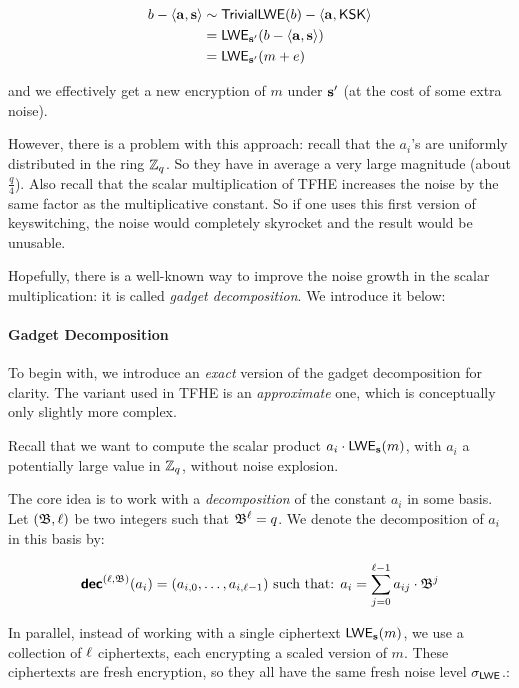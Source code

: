 \begin{align*}
	b - \langle \mathbf a, \mathbf s \rangle &\sim \textsf{TrivialLWE}(b) - \left \langle  \mathbf a, \textsf{KSK} \right \rangle\\
	& = \textsf{LWE}_{\mathbf s'}(b - \langle \mathbf a, \mathbf s \rangle)\\
		 &= \textsf{LWE}_{\mathbf s'}(m + e)
\end{align*}


and we effectively get a new encryption of $m$ under $\mathbf s'$ (at the cost of some extra noise).


However, there is a problem with this approach: recall that the $a_i$'s are uniformly distributed in the ring $\mathbb{Z}_q$. So they have in average a very large magnitude (about $\frac q 4$). Also recall that the scalar multiplication of TFHE increases the noise by the same factor as the multiplicative constant. So if one uses this first version of keyswitching, the noise would completely skyrocket and the result would be unusable.

Hopefully, there is a well-known way to improve the noise growth in the scalar multiplication: it is called \textit{gadget decomposition}. We introduce it below:

\paragraph{Gadget Decomposition}

To begin with, we introduce an \textit{exact} version of the gadget decomposition for clarity. The variant used in TFHE is an \textit{approximate} one, which is conceptually only slightly more complex.


Recall that we want to compute the scalar product $a_i \cdot \textsf{LWE}_{\mathbf s}(m)$, with $a_i$ a potentially large value in $\mathbb{Z}_q$, without noise explosion.

The core idea is to work with a \textit{decomposition} of the constant $a_i$ in some basis. Let $(\mathfrak{B}, \ell)$ be two integers such that $\mathfrak{B}^\ell = q$. We denote the decomposition of $a_i$ in this basis by:

\[
	\textbf{\textsf{dec}}^{(\ell, \mathfrak{B})}(a_i) = (a_{i,0}, \dots, a_{i, \ell-1}) \text{ such that: } a_i = \sum_{j=0}^{\ell-1} a_{ij} \cdot \mathfrak{B}^j
\]

In parallel, instead of working with a single ciphertext $\textsf{LWE}_{\mathbf s}(m)$, we use a collection of $\ell$ ciphertexts, each encrypting a scaled version of $m$. These ciphertexts are fresh encryption, so they all have the same fresh noise level $\sigma_{\textsf{LWE}}$.: 


